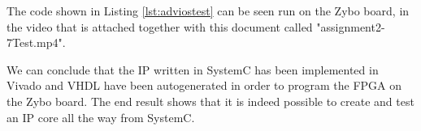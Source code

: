 The code shown in Listing \ref{lst:adviostest} can be seen run on the Zybo board, in the video that is attached together with this document called "assignment2-7Test.mp4".

We can conclude that the IP written in SystemC has been implemented in Vivado and VHDL have been autogenerated in order to program the FPGA on the Zybo board. The end result shows that it is indeed possible to create and test an IP core all the way from SystemC.